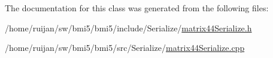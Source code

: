 The documentation for this class was generated from the following files\-:\begin{DoxyCompactItemize}
\item 
/home/ruijan/sw/bmi5/bmi5/include/\-Serialize/\hyperlink{matrix44Serialize_8h}{matrix44\-Serialize.\-h}\item 
/home/ruijan/sw/bmi5/bmi5/src/\-Serialize/\hyperlink{matrix44Serialize_8cpp}{matrix44\-Serialize.\-cpp}\end{DoxyCompactItemize}
